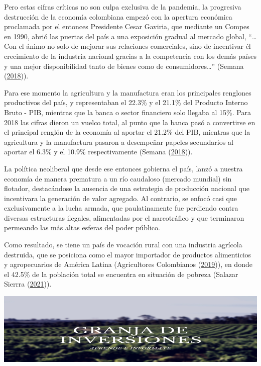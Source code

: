 \documentclass[
]{book}
\begin{document}
Pero estas cifras críticas no son culpa exclusiva de la pandemia, la progresiva destrucción de la economía colombiana empezó con la apertura económica proclamada por el entonces Presidente Cesar Gaviria, que mediante un Compes en 1990, abrió las puertas del país a una exposición gradual al mercado global, ``\ldots{} Con el ánimo no solo de mejorar sus relaciones comerciales, sino de incentivar él crecimiento de la industria nacional gracias a la competencia con los demás países y una mejor disponibilidad tanto de bienes como de consumidores\ldots{}'' (Semana (\protect\hyperlink{ref-Semana2018Apertura}{2018})).

Para ese momento la agricultura y la manufactura eran los principales renglones productivos del país, y representaban el 22.3\% y el 21.1\% del Producto Interno Bruto - PIB, mientras que la banca o sector financiero solo llegaba al 15\%. Para 2018 las cifras dieron un vuelco total, al punto que la banca pasó a convertirse en el principal renglón de la economía al aportar el 21.2\% del PIB, mientras que la agricultura y la manufactura pasaron a desempeñar papeles secundarios al aportar el 6.3\% y el 10.9\% respectivamente (Semana (\protect\hyperlink{ref-Semana2018Apertura}{2018})).

La política neoliberal que desde ese entonces gobierna el país, lanzó a nuestra economía de manera prematura a un río caudaloso (mercado mundial) sin flotador, destacándose la ausencia de una estrategia de producción nacional que incentivara la generación de valor agregado. Al contrario, se enfocó casi que exclusivamente a la lucha armada, que paulatinamente fue perdiendo contra diversas estructuras ilegales, alimentadas por el narcotráfico y que terminaron permeando las más altas esferas del poder público.

Como resultado, se tiene un país de vocación rural con una industria agrícola destruida, que se posiciona como el mayor importador de productos alimenticios y agropecuarios de América Latina (Agricultores Colombianos (\protect\hyperlink{ref-SAC2019Agricultores}{2019})), en donde el 42.5\% de la población total se encuentra en situación de pobreza (Salazar Sierrra (\protect\hyperlink{ref-Republica2021millones}{2021})).

\includegraphics[width=1\linewidth,height=0.3\textheight]{imagenes/Granja1}
\end{document}
